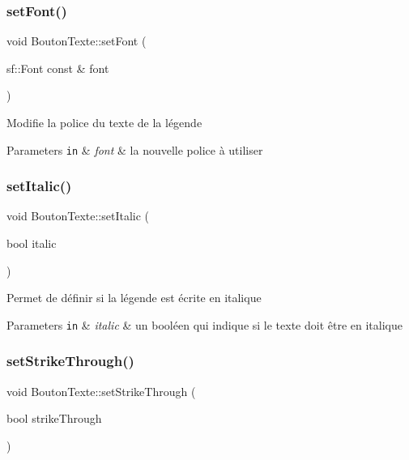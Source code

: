 \subsubsection{\texorpdfstring{set\+Font()}{setFont()}}
{\footnotesize\ttfamily void Bouton\+Texte\+::set\+Font (\begin{DoxyParamCaption}\item[{sf\+::\+Font const \&}]{font }\end{DoxyParamCaption})}

Modifie la police du texte de la légende 
\begin{DoxyParams}[1]{Parameters}
\mbox{\tt in}  & {\em font} & la nouvelle police à utiliser \\
\hline
\end{DoxyParams}
\mbox{\label{classBoutonTexte_aa448c0163aca20db26a3cd92d266ab83}} 
\subsubsection{\texorpdfstring{set\+Italic()}{setItalic()}}
{\footnotesize\ttfamily void Bouton\+Texte\+::set\+Italic (\begin{DoxyParamCaption}\item[{bool}]{italic }\end{DoxyParamCaption})}

Permet de définir si la légende est écrite en italique 
\begin{DoxyParams}[1]{Parameters}
\mbox{\tt in}  & {\em italic} & un booléen qui indique si le texte doit être en italique \\
\hline
\end{DoxyParams}
\mbox{\label{classBoutonTexte_ab81c1ce75bbb54265dad98c86c67ea74}} 
\subsubsection{\texorpdfstring{set\+Strike\+Through()}{setStrikeThrough()}}
{\footnotesize\ttfamily void Bouton\+Texte\+::set\+Strike\+Through (\begin{DoxyParamCaption}\item[{bool}]{strike\+Through }\end{DoxyParamCaption})}

